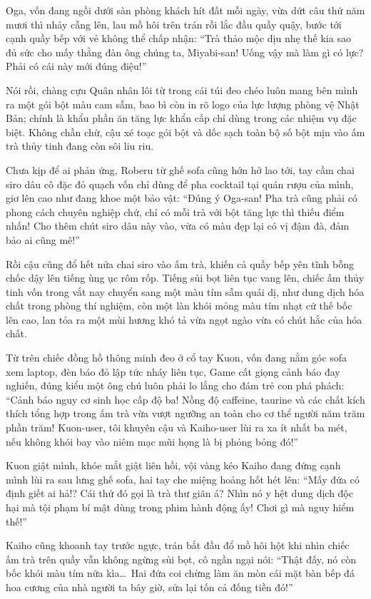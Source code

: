 \documentclass[../main.tex]{subfiles}
\begin{document}
Oga, vốn đang ngồi dưới sàn phòng khách hít đất mỗi ngày, vừa dứt câu thứ năm mươi thì nhảy cẫng lên, lau mồ hôi trên trán rồi lắc đầu quầy quậy, bước tới cạnh quầy bếp với vẻ không thể chấp nhận: ``Trà thảo mộc dịu nhẹ thế kia sao đủ sức cho mấy thằng đàn ông chúng ta, Miyabi-san! Uống vậy mà làm gì có lực? Phải có cái này mới đúng điệu!''

Nói rồi, chàng cựu Quân nhân lôi từ trong cái túi đeo chéo luôn mang bên mình ra một gói bột màu cam sẫm, bao bì còn in rõ logo của lực lượng phòng vệ Nhật Bản; chính là khẩu phần ăn tăng lực khẩn cấp chỉ dùng trong các nhiệm vụ đặc biệt. Không chần chừ, cậu xé toạc gói bột và dốc sạch toàn bộ số bột mịn vào ấm trà thủy tinh đang còn sôi liu riu.

Chưa kịp để ai phản ứng, Roberu từ ghế sofa cũng hớn hở lao tới, tay cầm chai siro dâu cô đặc đỏ quạch vốn chỉ dùng để pha cocktail tại quán rượu của mình, giơ lên cao như đang khoe một bảo vật: ``Đúng ý Oga-san! Pha trà cũng phải có phong cách chuyên nghiệp chứ, chỉ có mỗi trà với bột tăng lực thì thiếu điểm nhấn! Cho thêm chút siro dâu này vào, vừa có màu đẹp lại có vị đậm đà, đảm bảo ai cũng mê!''

Rồi cậu cũng đổ hết nửa chai siro vào ấm trà, khiến cả quầy bếp yên tĩnh bỗng chốc dậy lên tiếng ùng ục rôm rốp. Tiếng sủi bọt liên tục vang lên, chiếc ấm thủy tinh vốn trong vắt nay chuyển sang một màu tím sẫm quái dị, như dung dịch hóa chất trong phòng thí nghiệm, còn một làn khói mỏng màu tím nhạt cứ thế bốc lên cao, lan tỏa ra một mùi hương khó tả vừa ngọt ngào vừa có chút hắc của hóa chất.

Từ trên chiếc đồng hồ thông minh đeo ở cổ tay Kuon, vốn đang nằm góc sofa xem laptop, đèn báo đỏ lập tức nháy liên tục, Game cất giọng cảnh báo đay nghiến, đúng kiểu một ông chú luôn phải lo lắng cho đám trẻ con phá phách: ``Cảnh báo nguy cơ sinh học cấp độ ba! Nồng độ caffeine, taurine và các chất kích thích tổng hợp trong ấm trà vừa vượt ngưỡng an toàn cho cơ thể người năm trăm phần trăm! Kuon-user, tôi khuyên cậu và Kaiho-user lùi ra xa ít nhất ba mét, nếu không khói bay vào niêm mạc mũi họng là bị phỏng bỏng đó!''

Kuon giật mình, khóe mắt giật liên hồi, vội vàng kéo Kaiho đang đứng cạnh mình lùi ra sau lưng ghế sofa, hai tay che miệng hoảng hốt hét lên: ``Mấy đứa có định giết ai hả!? Cái thứ đó gọi là trà thư giãn á? Nhìn nó y hệt dung dịch độc hại mà tội phạm bí mật dùng trong phim hành động ấy! Chơi gì mà nguy hiểm thế!''

Kaiho cũng khoanh tay trước ngực, trán bắt đầu đổ mồ hôi hột khi nhìn chiếc ấm trà trên quầy vẫn không ngừng sủi bọt, cô ngần ngại nói: ``Thật đấy, nó còn bốc khói màu tím nữa kìa\dots\ Hai đứa coi chừng làm ăn mòn cái mặt bàn bếp đá hoa cương của nhà người ta bây giờ, sửa lại tốn cả đống tiền đó!''
\end{document}
